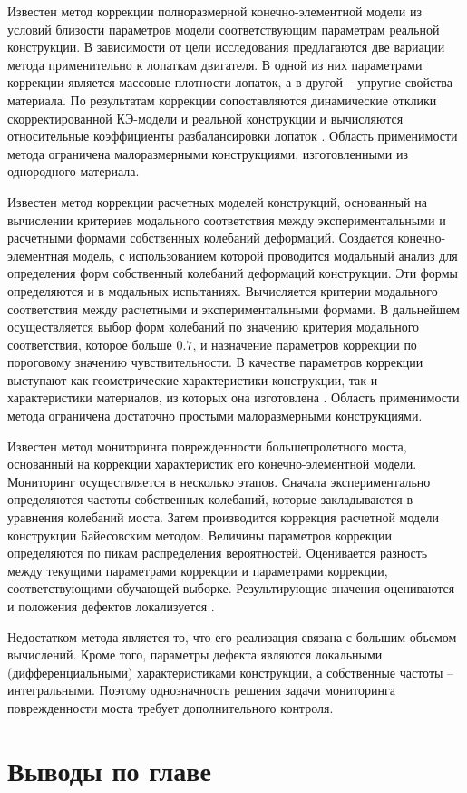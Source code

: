 Известен метод коррекции полноразмерной конечно-элементной модели из условий близости параметров модели соответствующим параметрам реальной конструкции. В зависимости от цели исследования предлагаются две вариации метода применительно к лопаткам двигателя. В одной из них параметрами коррекции является массовые плотности лопаток, а в другой – упругие свойства материала. По результатам коррекции сопоставляются динамические отклики скорректированной КЭ-модели и реальной конструкции и вычисляются относительные коэффициенты разбалансировки лопаток \cite{lib:modelUpdating:WO2019209410A1}. Область применимости метода ограничена малоразмерными конструкциями, изготовленными из однородного материала. 

Известен метод коррекции расчетных моделей конструкций, основанный на вычислении критериев модального соответствия между экспериментальными и расчетными формами собственных колебаний деформаций. Создается конечно-элементная модель, с использованием которой проводится модальный анализ для определения форм собственный колебаний деформаций конструкции. Эти формы определяются и в модальных испытаниях. Вычисляется критерии модального соответствия между расчетными и экспериментальными формами. В дальнейшем осуществляется выбор форм колебаний по значению критерия модального соответствия, которое больше $ 0.7 $, и назначение параметров коррекции по пороговому значению чувствительности. В качестве параметров коррекции выступают как геометрические характеристики конструкции, так и характеристики материалов, из которых она изготовлена \cite{lib:modelUpdating:CN106529055A}. Область применимости метода ограничена достаточно простыми малоразмерными конструкциями.
 
Известен метод мониторинга поврежденности большепролетного моста, основанный на коррекции характеристик его конечно-элементной модели. Мониторинг осуществляется в несколько этапов. Сначала экспериментально определяются частоты собственных колебаний, которые закладываются в уравнения колебаний моста. Затем производится коррекция расчетной модели конструкции Байесовским методом. Величины параметров коррекции определяются по пикам распределения вероятностей. Оценивается разность между текущими параметрами коррекции и параметрами коррекции, соответствующими обучающей выборке. Результирующие значения оцениваются и положения дефектов локализуется \cite{lib:modelUpdating:CN107687872A}. 

Недостатком метода является то, что его реализация связана с большим объемом вычислений. Кроме того, параметры дефекта являются локальными (дифференциальными) характеристиками конструкции, а собственные частоты – интегральными. Поэтому однозначность решения задачи мониторинга поврежденности моста требует дополнительного контроля. 

\section{Выводы по главе \thechapter}